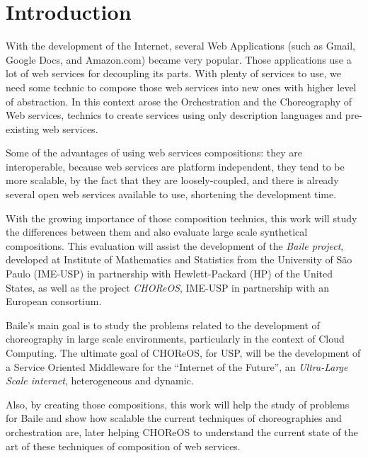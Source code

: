 \section{Introduction}

With the development of the Internet, several Web Applications (such as Gmail, Google Docs, and Amazon.com) became very popular. Those applications use a lot of web services for decoupling its parts. With plenty of services to use, we need some technic to compose those web services into new ones with higher level of abstraction. In this context arose the Orchestration and the Choreography of Web services, technics to create services using only description languages and pre-existing web services.

Some of the advantages of using web services compositions: they are interoperable, because web services are platform independent, they tend to be more scalable, by the fact that they are loosely-coupled, and there is already several open web services available to use, shortening the development time.

With the growing importance of those composition technics, this work will study the differences between them and also evaluate large scale synthetical compositions. This evaluation will assist the development of the \emph{Baile project}, developed at Institute of Mathematics and Statistics from the University of São Paulo (IME-USP) in partnership with Hewlett-Packard (HP) of the United States, as well as the project \emph{CHOReOS}, IME-USP in partnership with an European consortium.

Baile’s main goal is to study the problems related to the development of choreography in large scale environments, particularly in the context of Cloud Computing. The ultimate goal of CHOReOS, for USP, will be the development of a Service Oriented Middleware for the ``Internet of the Future'', an \emph{Ultra-Large Scale internet}, heterogeneous and dynamic.

Also, by creating those compositions, this work will help the study of problems for Baile and show how scalable the current techniques of choreographies and orchestration are, later helping CHOReOS to understand the current state of the art of these techniques of composition of web services.